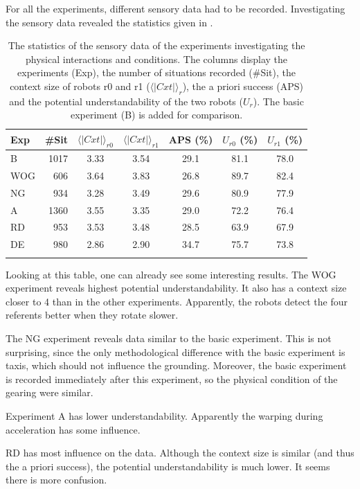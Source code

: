 For all the experiments, different sensory data had to be recorded. Investigating the sensory data revealed the statistics given in .

\begin{table}
\centering
\begin{tabular}{lrccccc}
\lsptoprule
Exp & \#Sit & $\langle | Cxt | \rangle_{r0}$ & $\langle | Cxt | \rangle_{r1}$ & APS (\%) & $U_{r0}$ (\%) & $U_{r1}$ (\%)\\\midrule
B & 1017 & 3.33 & 3.54 & 29.1 & 81.1 & 78.0\\%
WOG & 606 & 3.64 & 3.83 & 26.8 & 89.7 & 82.4\\%
NG & 934 & 3.28 & 3.49 & 29.6 & 80.9 & 77.9\\%
A & 1360 & 3.55 & 3.35 & 29.0 & 72.2 & 76.4\\%
RD & 953 & 3.53 & 3.48 & 28.5 & 63.9 & 67.9\\%
DE & 980 & 2.86 & 2.90 & 34.7 & 75.7 & 73.8\\%
\lspbottomrule
\end{tabular}
\caption{The statistics of the sensory data of the experiments investigating the physical interactions and conditions. The columns display the experiments (Exp), the number of situations recorded (\#Sit), the context size of robots r0 and r1 ($\langle | Cxt | \rangle_{r}$), the a priori success (APS) and the potential understandability of the two robots ($U_{r}$). The basic experiment (B) is added for comparison.}
\label{t:par:stats}
\end{table}


Looking at this table, one can already see some interesting results. The WOG experiment reveals highest potential understandability. It also has a context size closer to 4 than in the other experiments. Apparently, the robots detect the four referents better when they rotate slower. 

The NG experiment reveals data similar to the basic experiment. This is not surprising, since the only methodological difference with the basic experiment is taxis, which should not influence the grounding. Moreover, the basic experiment is recorded immediately after this experiment, so the physical condition of the gearing were similar.

Experiment A has lower understandability. Apparently the warping during acceleration has some influence.

RD has most influence on the data. Although the context size is similar (and thus the a priori success), the potential understandability is much lower. It seems there is more confusion.

